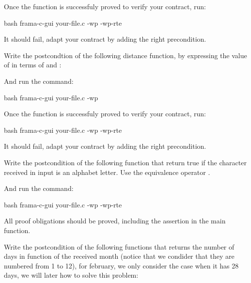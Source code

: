 Once the function is successfuly proved to verify your contract, run:


\begin{CodeBlock}{bash}
frama-c-gui your-file.c -wp -wp-rte
\end{CodeBlock}


It should fail, adapt your contract by adding the right precondition.




Write the postcondtion of the following distance function, by expressing
the value of  in terms of  and
:




And run the command:


\begin{CodeBlock}{bash}
frama-c-gui your-file.c -wp
\end{CodeBlock}


Once the function is successfuly proved to verify your contract, run:


\begin{CodeBlock}{bash}
frama-c-gui your-file.c -wp -wp-rte
\end{CodeBlock}


It should fail, adapt your contract by adding the right precondition.






Write the postcondition of the following function that return true if
the character received in input is an alphabet letter. Use the equivalence
operator \CodeInline{<==>}.





And run the command:


\begin{CodeBlock}{bash}
frama-c-gui your-file.c -wp -wp-rte
\end{CodeBlock}


All proof obligations should be proved, including the assertion in the
main function.






Write the postcondition of the following functions that returns the number
of days in function of the received month (notice that we condider that
they are numbered from 1 to 12), for february, we only consider the case
when it has 28 days, we will later how to solve this problem:



